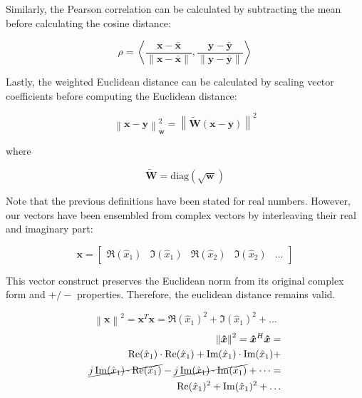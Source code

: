 \documentclass[../main.tex]{subfiles}
\begin{document}
Similarly, the Pearson correlation can be calculated by subtracting the mean before calculating the cosine distance:

\begin{equation}\label{eq:4:pearson}
    \rho = \left\langle \frac{\bm{x} - \bm{\bar{x}}}{\lVert \bm{x} - \bm{\bar{x}} \rVert} , \frac{\bm{y - \bm{\bar{y}}}}{\lVert \bm{y} - \bm{\bar{y}} \rVert} \right\rangle
\end{equation}

Lastly, the weighted Euclidean distance can be calculated by scaling vector coefficients before computing the Euclidean distance:

\begin{equation}\label{eq:4:l2_w}
    \left\lVert \bm{x} - \bm{y} \right\rVert^2_{\bm{w}} = \left\lVert \bm{\tilde{W}}(\bm{x} - \bm{y}) \right\rVert^2
\end{equation}

where 

\begin{equation}
    \bm{\tilde{W}} = \text{diag}(\sqrt{\bm{w}})
\end{equation}

Note that the previous definitions have been stated for real numbers. However, our vectors have been ensembled from complex vectors by interleaving their real and imaginary part:

\begin{equation}
    \bm{x} = 
    \begin{bmatrix}
        \Re(\hat{x}_1) & \Im(\hat{x}_1) & \Re(\hat{x}_2) & \Im(\hat{x}_2) & \dots  
    \end{bmatrix}
\end{equation}

This vector construct preserves the Euclidean norm from its original complex form and $+/-$ properties. Therefore, the euclidean distance remains valid.

\begin{equation}
    \left\lVert \bm{x} \right\rVert^2 = \bm{x}^T\bm{x} = \Re(\hat{x}_1)^2 + \Im(\hat{x}_1)^2 + \dots
\end{equation}
\begin{equation}
\begin{split}
    \left\lVert \bm{\hat{x}} \right\rVert^2 = \bm{\hat{x}}^H\bm{\hat{x}} =\\
    \Re(\hat{x}_1) \cdot \Re(\hat{x}_1) + \Im(\hat{x}_1) \cdot \Im(\hat{x}_1) +\\
    \cancel{j\Im(\hat{x}_1) \cdot \Re(\hat{x}_1)} - \cancel{j\Im(\hat{x}_1) \cdot \Im(\hat{x}_1)} + \dots =\\ \Re(\hat{x}_1)^2 + \Im(\hat{x}_1)^2 + \dots
\end{split}
\end{equation}
\end{document}
